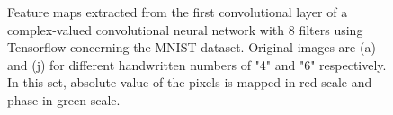 \begin{figure}
\begin{minipage}{\linewidth}
{			\label{fig:6featc7}
		}
		\caption{Feature maps extracted from the first convolutional layer of a complex-valued convolutional neural network with 8 filters using Tensorflow concerning the MNIST dataset. Original images are (a) and (j) for different handwritten numbers of "4" and "6" respectively. In this set, absolute value of the pixels is mapped in red scale and phase in green scale.}
		\label{fig:featsc}
	\end{minipage}
\end{figure}